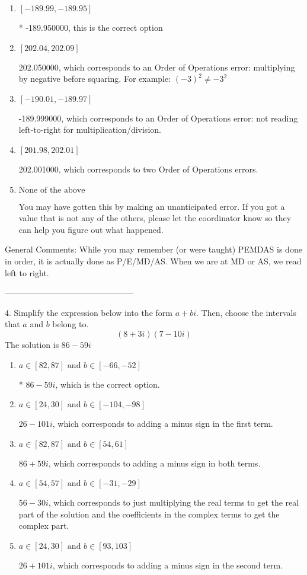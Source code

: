 \documentclass{article}[14pt]
\begin{document}
\begin{enumerate}[label=\Alph*.] 
\item $ [-189.99, -189.95] $ 

 * -189.950000, this is the correct option 
\item $ [202.04, 202.09] $ 

  202.050000, which corresponds to an Order of Operations error: multiplying by negative before squaring. For example: $(-3)^2 \neq -3^2$ 
\item $ [-190.01, -189.97] $ 

  -189.999000, which corresponds to an Order of Operations error: not reading left-to-right for multiplication/division. 
\item $ [201.98, 202.01] $ 

  202.001000, which corresponds to two Order of Operations errors. 
\item $ \text{None of the above} $ 

  You may have gotten this by making an unanticipated error. If you got a value that is not any of the others, please let the coordinator know so they can help you figure out what happened. 
\end{enumerate} 
 
General Comments: While you may remember (or were taught) PEMDAS is done in order, it is actually done as P/E/MD/AS. When we are at MD or AS, we read left to right.

-----------------------------------------------

4. Simplify the expression below into the form $a+bi$. Then, choose the intervals that $a$ and $b$ belong to.
$$ (8  + 3 i)(7  - 10 i) $$ 
The solution is $ 86  - 59 i $ 

\begin{enumerate}[label=\Alph*.] 
\item $ a \in [82, 87] \text{ and } b \in [-66, -52] $ 

 * $86  - 59 i$, which is the correct option. 
\item $ a \in [24, 30] \text{ and } b \in [-104, -98] $ 

  $26  - 101 i$, which corresponds to adding a minus sign in the first term. 
\item $ a \in [82, 87] \text{ and } b \in [54, 61] $ 

  $86  + 59 i$, which corresponds to adding a minus sign in both terms. 
\item $ a \in [54, 57] \text{ and } b \in [-31, -29] $ 

  $56  - 30 i$, which corresponds to just multiplying the real terms to get the real part of the solution and the coefficients in the complex terms to get the complex part. 
\item $ a \in [24, 30] \text{ and } b \in [93, 103] $ 

  $26  + 101 i$, which corresponds to adding a minus sign in the second term. 
\end{enumerate} 
 
\end{document}
